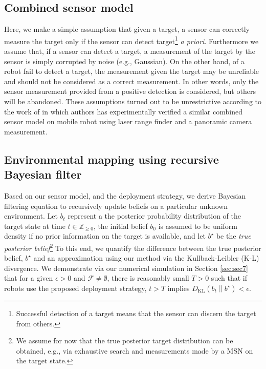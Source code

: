 \documentclass[letterpaper, 10 pt, conference]{ieeeconf}
\begin{document}



\subsection{Combined sensor model}
\label{sec:sec24}
Here, we make a simple assumption that given a target, a sensor can correctly measure the target only if the sensor can detect target\footnote{Successful detection of a target means that the sensor can discern the target from others.} \emph{a priori}.
Furthermore we assume that, if a sensor can detect a target, a measurement of the target by the sensor is simply corrupted by noise (e.g., Gaussian). On the other hand, of a robot fail to detect a target, the measurement given the target may be unreliable and should not be considered as a correct measurement. In other words, only the sensor measurement provided from a positive detection is considered, but others will be abandoned. These assumptions turned out to be unrestrictive according to the work of \cite{anguelov2004detecting} in which authors has experimentally verified a similar combined sensor model 
on mobile robot using laser range finder and a panoramic camera measurement.

\subsection{Environmental mapping using recursive Bayesian filter}
\label{sec:sec25}
Based on our sensor model, and the deployment strategy, we derive Bayesian filtering equation to recursively update beliefs on a particular unknown environment. 
Let $b_t$ represent a the posterior probability distribution of the target state at time $t \in \mathbb{Z}_{\geq 0}$, the initial belief $b_0$ is assumed to be uniform density if no prior information on the target is available, and let $b^{\star}$ be the \emph{true posterior belief}\footnote{We assume for now that the true posterior target distribution can be obtained, e.g., via exhaustive search and measurements made by a MSN on the target state.} 
To this end, we quantify the difference between the true posterior belief, $b^{\star}$ and an approximation using our method via the Kullback-Leibler (K-L) divergence.
We demonstrate via our numerical simulation in Section \ref{sec:sec7} that for a given $\epsilon>0$ and $\mathcal{F} \neq \emptyset$, there is reasonably small $T >0$ such that if robots use the proposed deployment strategy, $t>T$ implies $D_{\text{KL}}\left(b_{t} \middle\| b^{\star}\right) < \epsilon$.
\end{document}
